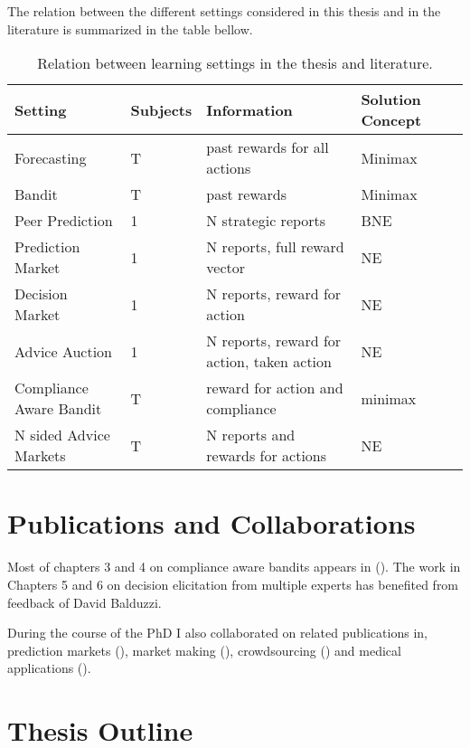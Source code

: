 The relation between the different settings considered in this thesis and in the literature is summarized in the table bellow.

\begin{table}
	\begin{tabular}{lllll}
		\toprule
		Setting & Subjects & Information & Solution Concept\\
		\midrule
		Forecasting & T  & past rewards for all actions & Minimax  \\
		Bandit & T  & past rewards &  Minimax  \\
		Peer Prediction & 1 & N strategic reports & BNE \\
		Prediction Market & 1 & N reports, full reward vector &  NE\\
		Decision Market & 1 & N reports, reward for action & NE  \\
		Advice Auction  & 1 & N reports, reward for action, taken action & NE  \\
		Compliance Aware Bandit & T  & reward for action and compliance & minimax \\
		N sided Advice Markets  & T  &  N  reports and rewards for actions & NE  \\
		\bottomrule
	\end{tabular}
	\caption{Relation between learning settings in the thesis and literature.}
\end{table}


\section{Publications and Collaborations}

Most of chapters 3 and 4 on compliance aware bandits appears in (\cite{della2016compliance}). The work in Chapters 5 and 6 on decision elicitation from multiple experts has benefited from feedback of David Balduzzi.

During the course of the PhD I also collaborated on related publications in, prediction markets (\cite{frongillo2012interpreting}), market making (\cite{kinathil2014closed,kinathil2016symbolic}), crowdsourcing (\cite{della2012crowd}) and medical applications (\cite{della2016out}).


\section{Thesis Outline}
\label{sec:outline}

